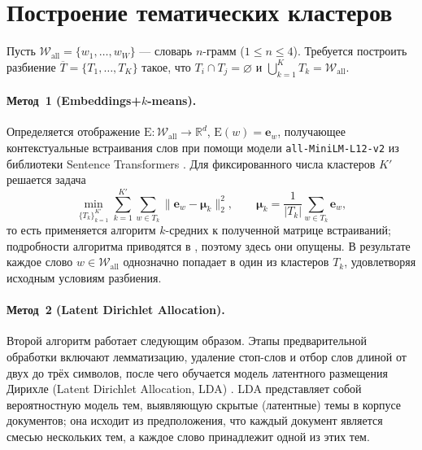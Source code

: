 \documentclass[14pt,a4paper]{article}
\begin{document}

\newpage
\section{Построение тематических кластеров}\label{ssec:cluster_build}
Пусть $\mathcal{W}_{\mathrm{all}}=\{w_1,\dots,w_W\}$ — словарь $n$-грамм ($1\le n\le4$). Требуется построить разбиение $\overline{T}=\{T_1,\dots,T_K\}$ такое, что $T_i\cap T_j=\varnothing$ и $\bigcup_{k=1}^{K}T_k=\mathcal{W}_{\mathrm{all}}$. 

\paragraph{Метод~1 (Embeddings+$k$-means).}
Определяется отображение $\mathrm{E}\colon\mathcal{W}_{\mathrm{all}}\to\mathbb{R}^d$, $\mathrm{E}(w)=\mathbf e_w$, получающее контекстуальные встраивания слов при помощи модели \texttt{all-MiniLM-L12-v2} из библиотеки Sentence Transformers \cite{Reimers2019,SentenceTransformers}. Для фиксированного числа кластеров $K'$ решается задача 
\[
\min_{\{T_k\}_{k=1}^{K'}}\sum_{k=1}^{K'}\sum_{w\in T_k}\bigl\|\mathbf e_w-\boldsymbol\mu_k\bigr\|_2^{2},\qquad
\boldsymbol\mu_k=\frac{1}{|T_k|}\sum_{w\in T_k}\mathbf e_w,
\]
то есть применяется алгоритм $k$-средних к полученной матрице встраиваний; подробности алгоритма приводятся в \cite{sinaga2020unsupervised}, поэтому здесь они опущены. В результате каждое слово $w\in\mathcal{W}_{\mathrm{all}}$ однозначно попадает в один из кластеров $T_k$, удовлетворяя исходным условиям разбиения.

\paragraph{Метод~2 (Latent Dirichlet Allocation).}
Второй алгоритм работает следующим образом. Этапы предварительной обработки включают лемматизацию, удаление стоп-слов и отбор слов длиной от двух до трёх символов, после чего обучается модель латентного размещения Дирихле (Latent Dirichlet Allocation, LDA) \cite{blei2003latent}. LDA представляет собой вероятностную модель тем, выявляющую скрытые (латентные) темы в корпусе документов; она исходит из предположения, что каждый документ является смесью нескольких тем, а каждое слово принадлежит одной из этих тем.
\end{document}
